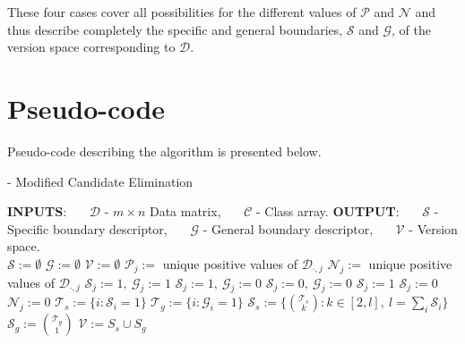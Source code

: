 These four cases cover all possibilities for the different values of $\mathcal{P}$ and $\mathcal{N}$ and thus describe completely the specific and general boundaries, $\mathcal{S}$ and $\mathcal{G}$, of the version space corresponding to $\mathcal{D}$.

\section{Pseudo-code}

Pseudo-code describing the algorithm is presented below.
 
\begin{Algorithm}[H]{12cm}
  \caption{ - Modified Candidate Elimination}
  \begin{algorithmic} 
    \State \textbf{INPUTS}: 
    \State \ \ \ $\mathcal{D}$ - $m \times n$ Data matrix,
    \State \ \ \ $\mathcal{C}$ - Class array.
    \State \textbf{OUTPUT}: 
    \State \ \ \ $\mathcal{S}$ - Specific boundary descriptor,
    \State \ \ \ $\mathcal{G}$ - General boundary descriptor, 
    \State \ \ \ $\mathcal{V}$ - Version space.
    \\
    \hrulefill
      \State $\mathcal{S} := \emptyset$
      \State $\mathcal{G} := \emptyset$
      \State $\mathcal{V} := \emptyset$
        \State $\mathcal{P}_j :=$ unique positive values of $\mathcal{D}_{\cdot,j}$
        \State $\mathcal{N}_j :=$ unique positive values of $\mathcal{D}_{\cdot,j}$
          \State $\mathcal{S}_j := 1,\ \mathcal{G}_j := 1$
          \State $\mathcal{S}_j := 1,\ \mathcal{G}_j := 0$
          \State $\mathcal{S}_j := 0,\ \mathcal{G}_j := 0$
            \State $\mathcal{S}_j := 1$
          \Else
            \State $\mathcal{S}_j := 0$
          \EndIf
          \State $\mathcal{N}_j := 0$
        \EndIf
      \EndFor
      \State $\mathcal{T}_s := \{i : \mathcal{S}_i = 1\}$
      \State $\mathcal{T}_g := \{i : \mathcal{G}_i = 1\}$
      \State $\mathcal{S}_s := \{\binom{\mathcal{T}_s}{k} : k \in [2,l],\ l = \sum_i \mathcal{S}_i\}$
      \State $\mathcal{S}_g := \binom{\mathcal{T}_g}{1}$
      \State $\mathcal{V} := S_s \cup S_g$
    \EndFunction
  \end{algorithmic}
\end{Algorithm}

